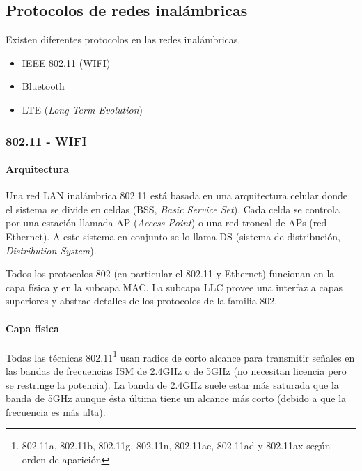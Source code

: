 \documentclass{book}
\begin{document}
	\subsection{Protocolos de redes inalámbricas}
	Existen diferentes protocolos en las redes inalámbricas.
	
	\begin{itemize}
		\item IEEE 802.11 (WIFI)
		
		\item Bluetooth
		
		\item LTE (\textit{Long Term Evolution})
	\end{itemize}
	
	\subsubsection{802.11 - WIFI}
	\paragraph{Arquitectura} Una red LAN inalámbrica 802.11 está basada en una arquitectura celular donde el sistema se divide en celdas (BSS, \textit{Basic Service Set}). Cada celda se controla por una estación llamada AP (\textit{Access Point}) o una red troncal de APs (red Ethernet). A este sistema en conjunto se lo llama DS (sistema de distribución, \textit{Distribution System}).
	
	\vspace{3mm}
	Todos los protocolos 802 (en particular el 802.11 y Ethernet) funcionan en la capa física y en la subcapa MAC. La subcapa LLC provee una interfaz a capas superiores y abstrae detalles de los protocolos de la familia 802.
	
	\paragraph{Capa física} Todas las técnicas 802.11\footnote{802.11a, 802.11b, 802.11g, 802.11n, 802.11ac, 802.11ad y 802.11ax según orden de aparición} usan radios de corto alcance para transmitir señales en las bandas de frecuencias ISM de 2.4GHz o de 5GHz (no necesitan licencia pero se restringe la potencia). La banda de 2.4GHz suele estar más saturada que la banda de 5GHz aunque ésta última tiene un alcance más corto (debido a que la frecuencia es más alta).
	
\end{document}
